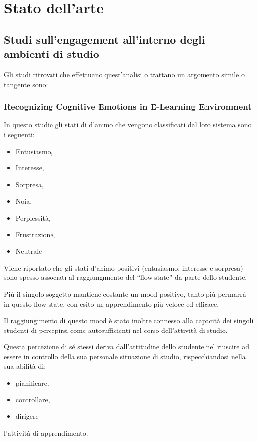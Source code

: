 \chapter{Stato dell'arte}

\section{Studi sull’engagement all’interno degli ambienti di studio}
Gli studi ritrovati che effettuano quest’analisi o trattano un argomento simile o tangente sono:
\subsection{Recognizing Cognitive Emotions in E-Learning Environment}
In questo studio \cite{RecoCognEmoELearnEnv} gli stati di d’animo che vengono classificati dal loro sistema sono i seguenti:
\begin{itemize}
    \item Entusiasmo,
    \item Interesse,
    \item Sorpresa,
    \item Noia,
    \item Perplessità,
    \item Frustrazione,
    \item Neutrale
\end{itemize}

Viene riportato che gli stati d’animo positivi (entusiasmo, interesse e sorpresa) sono spesso associati al raggiungimento del “flow state” da parte dello studente.

Più il singolo soggetto mantiene costante un mood positivo, tanto più permarrà in questo flow state, con esito un apprendimento più veloce ed efficace.

Il raggiungimento di questo mood è stato inoltre connesso alla capacità dei singoli studenti di percepirsi come autosufficienti nel corso dell’attività di studio.

Questa percezione di sé stessi deriva dall’attitudine dello studente nel riuscire ad essere in controllo della sua personale situazione di studio, rispecchiandosi nella sua abilità di:
\begin{itemize}
    \item pianificare,
    \item controllare,
    \item dirigere
\end{itemize}
l’attività di apprendimento.


